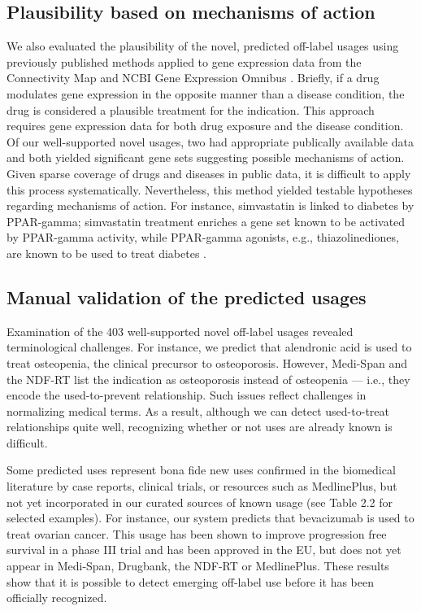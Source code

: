 \subsection{Plausibility based on mechanisms of action}
We also evaluated the plausibility of the novel, predicted off-label
usages using previously published methods \cite{Sirota2011} applied to
gene expression data from the Connectivity Map \cite{Lamb2006} and
NCBI Gene Expression Omnibus \cite{Edgar2002}.  Briefly, if a drug
modulates gene expression in the opposite manner than a disease
condition, the drug is considered a plausible treatment for the
indication.  This approach requires gene expression data for both drug
exposure and the disease condition.  Of our well-supported novel
usages, two had appropriate publically available data and both yielded
significant gene sets suggesting possible mechanisms of action.  Given
sparse coverage of drugs and diseases in public data, it is difficult
to apply this process systematically.  Nevertheless, this method
yielded testable hypotheses regarding mechanisms of action.  For
instance, simvastatin is linked to diabetes by PPAR-gamma; simvastatin
treatment enriches a gene set known to be activated by PPAR-gamma
activity, while PPAR-gamma agonists, e.g., thiazolinediones, are known
to be used to treat diabetes \cite{Grip2002,Altshuler2000}.

\subsection{Manual validation of the predicted usages}
Examination of the 403 well-supported novel off-label usages revealed
terminological challenges.  For instance, we predict that alendronic
acid is used to treat osteopenia, the clinical precursor to
osteoporosis.  However, Medi-Span and the NDF-RT list the indication
as osteoporosis instead of osteopenia — i.e., they encode the
used-to-prevent relationship. Such issues reflect challenges in
normalizing medical terms.  As a result, although we can detect
used-to-treat relationships quite well, recognizing whether or not
uses are already known is difficult.

Some predicted uses represent bona fide new uses confirmed in the
biomedical literature by case reports, clinical trials, or resources
such as MedlinePlus, but not yet incorporated in our curated sources
of known usage (see Table 2.2 for selected examples).  For instance,
our system predicts that bevacizumab is used to treat ovarian cancer.
This usage has been shown to improve progression free survival in a
phase III trial \cite{Perren2011} and has been approved in the EU, but
does not yet appear in Medi-Span, Drugbank, the NDF-RT or MedlinePlus.
These results show that it is possible to detect emerging off-label
use before it has been officially recognized.


